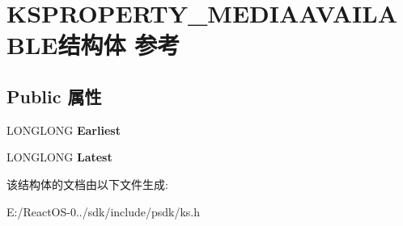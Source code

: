 \hypertarget{struct_k_s_p_r_o_p_e_r_t_y___m_e_d_i_a_a_v_a_i_l_a_b_l_e}{}\section{K\+S\+P\+R\+O\+P\+E\+R\+T\+Y\+\_\+\+M\+E\+D\+I\+A\+A\+V\+A\+I\+L\+A\+B\+L\+E结构体 参考}
\label{struct_k_s_p_r_o_p_e_r_t_y___m_e_d_i_a_a_v_a_i_l_a_b_l_e}
\subsection*{Public 属性}
\begin{DoxyCompactItemize}
\item 
\mbox{\label{struct_k_s_p_r_o_p_e_r_t_y___m_e_d_i_a_a_v_a_i_l_a_b_l_e_a0ff3eb2fb0a34ee47513d2aec844b30d}} 
L\+O\+N\+G\+L\+O\+NG {\bfseries Earliest}
\item 
\mbox{\label{struct_k_s_p_r_o_p_e_r_t_y___m_e_d_i_a_a_v_a_i_l_a_b_l_e_a22df0452fc14201d10124a3eb59376d8}} 
L\+O\+N\+G\+L\+O\+NG {\bfseries Latest}
\end{DoxyCompactItemize}


该结构体的文档由以下文件生成\+:\begin{DoxyCompactItemize}
\item 
E\+:/\+React\+O\+S-\/0../sdk/include/psdk/ks.\+h\end{DoxyCompactItemize}
